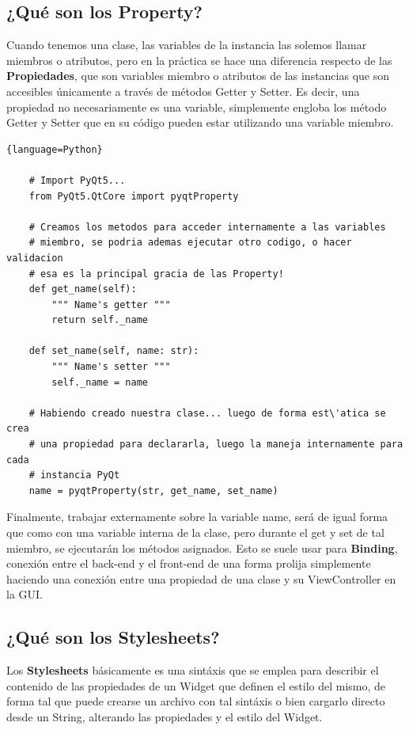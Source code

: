 \subsection{¿Qu\'e son los Property?}
\label{qt_properties}
Cuando tenemos una clase, las variables de la instancia las solemos llamar miembros o atributos, pero en la pr\'actica se hace una diferencia
respecto de las \textbf{Propiedades}, que son variables miembro o atributos de las instancias que son accesibles \'unicamente a trav\'es de m\'etodos
Getter y Setter. Es decir, una propiedad no necesariamente es una variable, simplemente engloba los m\'etodo Getter y Setter que en su c\'odigo pueden estar
utilizando una variable miembro.

\begin{lstlisting}{language=Python}

    # Import PyQt5...
    from PyQt5.QtCore import pyqtProperty

    # Creamos los metodos para acceder internamente a las variables
    # miembro, se podria ademas ejecutar otro codigo, o hacer validacion
    # esa es la principal gracia de las Property!
    def get_name(self):
        """ Name's getter """
        return self._name
    
    def set_name(self, name: str):
        """ Name's setter """
        self._name = name

    # Habiendo creado nuestra clase... luego de forma est\'atica se crea
    # una propiedad para declararla, luego la maneja internamente para cada
    # instancia PyQt
    name = pyqtProperty(str, get_name, set_name)

\end{lstlisting}

Finalmente, trabajar externamente sobre la variable name, ser\'a de igual forma que como con una variable
interna de la clase, pero durante el get y set de tal miembro, se ejecutar\'an los m\'etodos asignados. Esto
se suele usar para \textbf{Binding}, conexi\'on entre el back-end y el front-end de una forma prolija simplemente
haciendo una conexi\'on entre una propiedad de una clase y su ViewController en la GUI.

\subsection{¿Qu\'e son los Stylesheets?}
\label{qt_stylesheets}
Los \textbf{Stylesheets} b\'asicamente es una sint\'axis que se emplea para describir el contenido de las propiedades
de un Widget que definen el estilo del mismo, de forma tal que puede crearse un archivo con tal sint\'axis o bien cargarlo
directo desde un String, alterando las propiedades y el estilo del Widget.

